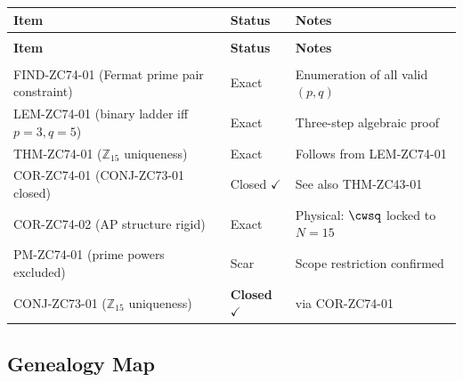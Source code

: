 \documentclass[12pt, a4paper]{article}
\begin{document}
{\small
\setlength{\LTpre}{4pt}\setlength{\LTpost}{4pt}
\renewcommand{\arraystretch}{1.30}
\begin{longtable}{>{\raggedright\arraybackslash}p{5.5cm}
                  >{\centering\arraybackslash}p{2.2cm}
                  >{\raggedright\arraybackslash}p{5.0cm}}
\toprule
\textbf{Item} & \textbf{Status} & \textbf{Notes} \\
\midrule
\endfirsthead
\multicolumn{3}{l}{\small\textit{(continued)}}\\[4pt]
\toprule\textbf{Item} & \textbf{Status} & \textbf{Notes}\\\midrule
\endhead
\midrule\multicolumn{3}{r}{\small\textit{(continues)}}\\
\endfoot
\bottomrule
\endlastfoot
FIND-ZC74-01 (Fermat prime pair constraint)
  & Exact & Enumeration of all valid $(p,q)$ \\[4pt]
LEM-ZC74-01 (binary ladder iff $p=3, q=5$)
  & Exact & Three-step algebraic proof \\[4pt]
THM-ZC74-01 ($\mathbb{Z}_{15}$ uniqueness)
  & Exact & Follows from LEM-ZC74-01 \\[4pt]
COR-ZC74-01 (CONJ-ZC73-01 closed)
  & Closed $\checkmark$ & See also THM-ZC43-01 \\[4pt]
COR-ZC74-02 (AP structure rigid)
  & Exact & Physical: $\cwsq$ locked to $N=15$ \\[4pt]
PM-ZC74-01 (prime powers excluded)
  & Scar & Scope restriction confirmed \\[4pt]
\midrule
CONJ-ZC73-01 ($\mathbb{Z}_{15}$ uniqueness)
  & \textbf{Closed} $\checkmark$ & via COR-ZC74-01 \\
\bottomrule
\end{longtable}
}

\subsection{Genealogy Map}
\label{sec:genealogy}
\end{document}
